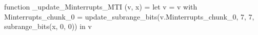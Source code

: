 function _update_Minterrupts_MTI (v, x) = let v = { v with Minterrupts_chunk_0 = update_subrange_bits(v.Minterrupts_chunk_0, 7, 7, subrange_bits(x, 0, 0)) } in
  v
